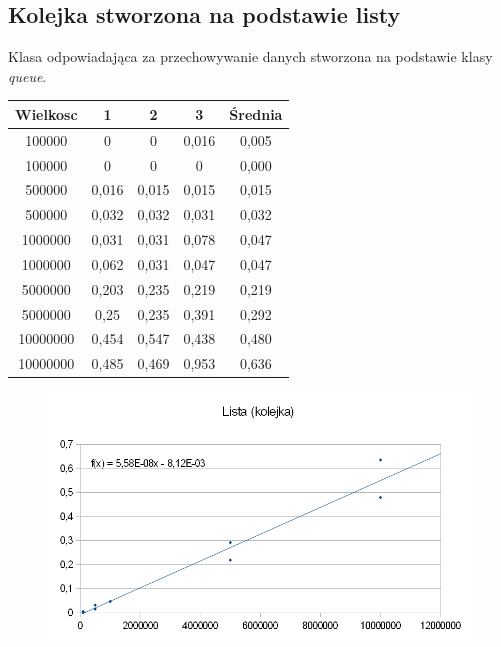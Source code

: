 \documentclass[12pt,a4paper,titlepage]{article}
\begin{document}
\subsection{Kolejka stworzona na podstawie listy}
Klasa odpowiadająca za przechowywanie danych stworzona na podstawie klasy \textit{queue}. 
\begin{center}
\begin {tabular}{|c|c|c|c|c|}\hline
Wielkosc & 1 & 2 & 3 & Średnia \\\hline
100000&0&0&0,016&0,005 \\\hline
100000&0&0&0&0,000 \\\hline
500000&0,016&0,015&0,015&0,015 \\\hline
500000&0,032&0,032&0,031&0,032 \\\hline
1000000&0,031&0,031&0,078&0,047 \\\hline
1000000&0,062&0,031&0,047&0,047 \\\hline
5000000&0,203&0,235&0,219&0,219 \\\hline
5000000&0,25&0,235&0,391&0,292 \\\hline
10000000&0,454&0,547&0,438&0,480 \\\hline
10000000&0,485&0,469&0,953&0,636 \\\hline
\end{tabular}
\end {center}
\begin{figure}[h]
\begin{center}
\includegraphics[scale=0.5]{Lista_(kolejka).png}
\end{center}
\end{figure}

\newpage
\end{document}
